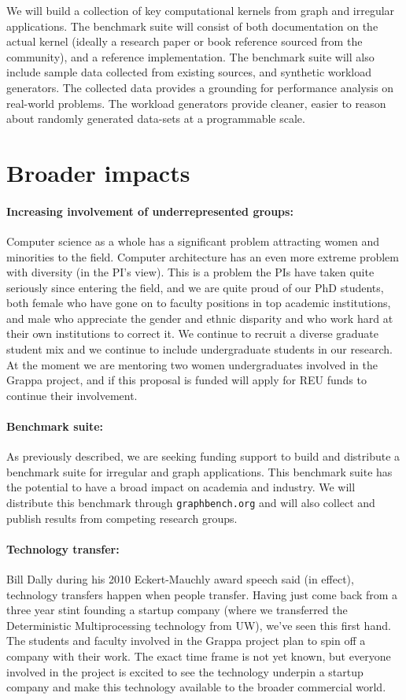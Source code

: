 We will build a collection of key computational kernels from graph and irregular applications. The benchmark suite will consist of both documentation on the actual kernel (ideally a research paper or book reference sourced from the community), and a reference implementation. The benchmark suite will also include sample data collected from existing sources, and synthetic workload generators. The collected data provides a grounding for performance analysis on real-world problems. The workload generators provide cleaner, easier to reason about randomly generated data-sets at a programmable scale.

\section{Broader impacts}

\paragraph{Increasing involvement of underrepresented groups:} Computer science as a whole has a significant problem attracting women and minorities to the field.  Computer architecture has an even more extreme problem with diversity (in the PI's view).  This is a problem the PIs have taken quite seriously since entering the field, and we are quite proud of our PhD students, both female who have gone on to faculty positions in top academic institutions, and male who appreciate the gender and ethnic disparity and who work hard at their own institutions to correct it.  We continue to recruit a diverse graduate student mix and we continue to include undergraduate students in our research.  At the moment we are mentoring two women undergraduates involved in the Grappa project, and if this proposal is funded will apply for REU funds to continue their involvement.

\paragraph{Benchmark suite:} As previously described, we are seeking funding support to build and distribute a benchmark suite for irregular and graph applications.  This benchmark suite has the potential to have a broad impact on academia and industry.  We will distribute this benchmark through \texttt{graphbench.org} and will also collect and publish results from competing research groups.

\paragraph{Technology transfer:} Bill Dally during his 2010 Eckert-Mauchly award speech said (in effect), technology transfers happen when people transfer.  Having just come back from a three year stint founding a startup company (where we transferred the Deterministic Multiprocessing technology from UW), we've seen this first hand.  The students and faculty involved in the Grappa project plan to spin off a company with their work.  The exact time frame is not yet known, but everyone involved in the project is excited to see the technology underpin a startup company and make this technology available to the broader commercial world.

